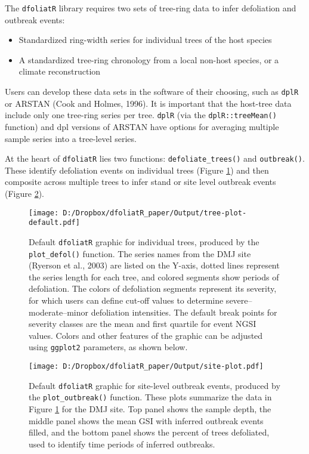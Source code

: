 \documentclass[review]{elsarticle} %
\makeatletter
\providecommand{\tightlist}{%
  \setlength{\itemsep}{0pt}\setlength{\parskip}{0pt}}
\def\maxwidth{\ifdim\Gin@nat@width>\linewidth\linewidth
\else\Gin@nat@width\fi}
\let\Oldincludegraphics\includegraphics
\renewcommand{\includegraphics}[1]{\Oldincludegraphics[width=\maxwidth]{#1}}
\makeatother
\begin{document}
The \texttt{dfoliatR} library requires two sets of tree-ring data to infer defoliation and outbreak events:

\begin{itemize}
\tightlist
\item
  Standardized ring-width series for individual trees of the host species
\item
  A standardized tree-ring chronology from a local non-host species, or a climate reconstruction
\end{itemize}

Users can develop these data sets in the software of their choosing, such as \texttt{dplR} or ARSTAN (Cook and Holmes, 1996). It is important that the host-tree data include only one tree-ring series per tree. \texttt{dplR} (via the \texttt{dplR::treeMean()} function) and dpl versions of ARSTAN have options for averaging multiple sample series into a tree-level series.

At the heart of \texttt{dfoliatR} lies two functions: \texttt{defoliate\_trees()} and \texttt{outbreak()}. These identify defoliation events on individual trees (Figure \ref{fig:fig-defol}) and then composite across multiple trees to infer stand or site level outbreak events (Figure \ref{fig:fig-obr}).



\begin{figure}
\centering
\texttt{[image: D:/Dropbox/dfoliatR\_paper/Output/tree-plot-default.pdf]}
\caption{\label{fig:fig-defol}Default \texttt{dfoliatR} graphic for individual trees, produced by the \texttt{plot\_defol()} function. The series names from the DMJ site (Ryerson et al., 2003) are listed on the Y-axis, dotted lines represent the series length for each tree, and colored segments show periods of defoliation. The colors of defoliation segments represent its severity, for which users can define cut-off values to determine severe--moderate--minor defoliation intensities. The default break points for severity classes are the mean and first quartile for event NGSI values. Colors and other features of the graphic can be adjusted using \texttt{ggplot2} parameters, as shown below.}
\end{figure}



\begin{figure}
\centering
\texttt{[image: D:/Dropbox/dfoliatR\_paper/Output/site-plot.pdf]}
\caption{\label{fig:fig-obr}Default \texttt{dfoliatR} graphic for site-level outbreak events, produced by the \texttt{plot\_outbreak()} function. These plots summarize the data in Figure \ref{fig:fig-defol} for the DMJ site. Top panel shows the sample depth, the middle panel shows the mean GSI with inferred outbreak events filled, and the bottom panel shows the percent of trees defoliated, used to identify time periods of inferred outbreaks.}
\end{figure}
\end{document}
